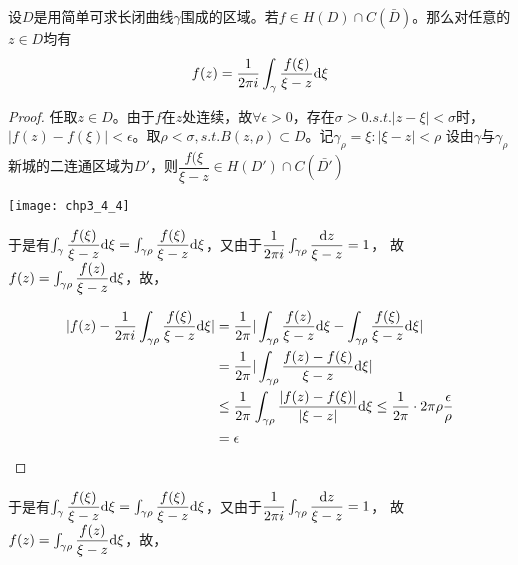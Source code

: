 \begin{mypro}
	设$D$是用简单可求长闭曲线$\gamma$围成的区域。若$f\in H(D)\cap C(\bar{D})$。那么对任意的$z\in D$均有
	\[f(z)=\dfrac{1}{2\pi i}\int_\gamma\dfrac{f(\xi)}{\xi-z}\mathrm{d}\xi\]
\end{mypro}
\begin{proof}
	任取$z\in D$。由于$f$在$z$处连续，故$\forall\epsilon>0$，存在$\sigma>0.s.t.|z-\xi|<\sigma$时，$|f(z)-f(\xi)|<\epsilon$。取$\rho<\sigma,s.t.B(z,\rho)\subset D$。记$\gamma_\rho={\xi:|\xi-z|<\rho}$
	设由$\gamma$与$\gamma_\rho$新城的二连通区域为$D'$，则$\dfrac{f(\xi}{\xi-z}\in H(D')\cap C(\bar{D'})$
	\begin{center}
		\texttt{[image: chp3\_4\_4]}
	\end{center}
	于是有$\int_\gamma\dfrac{f(\xi)}{\xi-z}\mathrm{d}\xi=\int_{\gamma\rho}\dfrac{f(\xi)}{\xi-z}\mathrm{d}\xi$，又由于$\dfrac{1}{2\pi i}\int_{\gamma\rho}\dfrac{\mathrm{d}z}{\xi-z}=1$，
	故$f(z)=\int_{\gamma\rho}\dfrac{f(z)}{\xi-z}\mathrm{d}\xi$，故，
	
	\begin{align*}
	|f(z)-\dfrac{1}{2\pi i}\int_{\gamma\rho}\dfrac{f(\xi)}{\xi-z}\mathrm{d}\xi|&=\dfrac{1}{2\pi}|\int_{\gamma\rho}\dfrac{f(z)}{\xi-z}\mathrm{d}\xi-\int_{\gamma\rho}\dfrac{f(\xi)}{\xi-z}\mathrm{d}\xi|\\
	&=\dfrac{1}{2\pi}|\int_{\gamma\rho}\dfrac{f(z)-f(\xi)}{\xi-z}\mathrm{d}\xi|\\
	&\leq\dfrac{1}{2\pi}\int_{\gamma\rho}\dfrac{|f(z)-f(\xi)|}{|\xi-z|}\mathrm{d}\xi\leq\dfrac{1}{2\pi}\cdot 2\pi \rho\dfrac{\epsilon}{\rho}\\
	&=\epsilon 
	\end{align*}
\end{proof}

于是有$\int_\gamma\dfrac{f(\xi)}{\xi-z}\mathrm{d}\xi=\int_{\gamma\rho}\dfrac{f(\xi)}{\xi-z}\mathrm{d}\xi$，又由于$\dfrac{1}{2\pi i}\int_{\gamma\rho}\dfrac{\mathrm{d}z}{\xi-z}=1$，
故$f(z)=\int_{\gamma\rho}\dfrac{f(z)}{\xi-z}\mathrm{d}\xi$，故，


